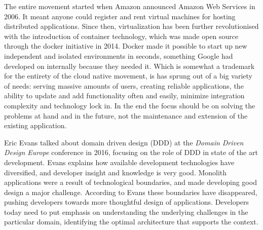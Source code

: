 The entire movement started when Amazon announced Amazon Web Services in 2006. It meant anyone could register and rent virtual machines for hosting distributed applications. Since then, virtualization has been further revolutionised with the introduction of container technology, which was made open source through the docker initiative in 2014. Docker made it possible to start up new independent and isolated environments in seconds, something Google had developed on internally because they needed it. Which is somewhat a trademark for the entirety of the cloud native movement, is has sprung out of a big variety of needs: serving massive amounts of users, creating reliable applications, the ability to update and add functionality often and easily, minimize integration complexity and technology lock in. In the end the focus should be on solving the problems at hand and in the future, not the maintenance and extension of the existing application.

Eric Evans talked about domain driven design (DDD) at the \textit{Domain Driven Design Europe} conference\cite{evans2016tackling} in 2016, focusing on the role of DDD in state of the art development. Evans explains how available development technologies have diversified, and developer insight and knowledge is very good. Monolith applications were a result of technological boundaries, and made developing good design a major challenge. According to Evans these boundaries have disappeared, pushing developers towards more thoughtful design of applications. Developers today need to put emphasis on understanding the underlying challenges in the particular domain, identifying the optimal architecture that supports the context.

\newpage
